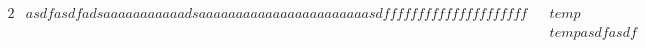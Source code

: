 \begin{alignat}{2}
    & asdfasdfadsaaaaaaaaaaadsaaaaaaaaaaaaaaaaaaaaaaasdfffffffffffffffffffff & & temp \\
    &                                                                        & & tempasdfasdf \\
\end{alignat}
